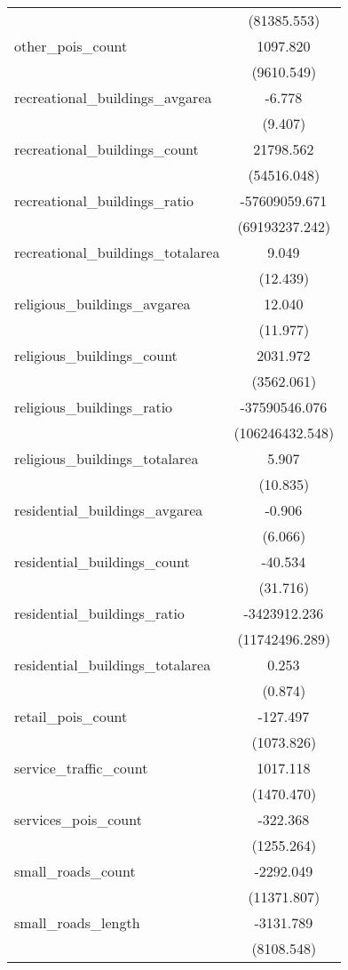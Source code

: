\begin{table}[!htbp]
\begin{tabular}{@{\extracolsep{5pt}}lc}
  & (81385.553) \\
 other_pois_count & 1097.820$^{}$ \\
  & (9610.549) \\
 recreational_buildings_avgarea & -6.778$^{}$ \\
  & (9.407) \\
 recreational_buildings_count & 21798.562$^{}$ \\
  & (54516.048) \\
 recreational_buildings_ratio & -57609059.671$^{}$ \\
  & (69193237.242) \\
 recreational_buildings_totalarea & 9.049$^{}$ \\
  & (12.439) \\
 religious_buildings_avgarea & 12.040$^{}$ \\
  & (11.977) \\
 religious_buildings_count & 2031.972$^{}$ \\
  & (3562.061) \\
 religious_buildings_ratio & -37590546.076$^{}$ \\
  & (106246432.548) \\
 religious_buildings_totalarea & 5.907$^{}$ \\
  & (10.835) \\
 residential_buildings_avgarea & -0.906$^{}$ \\
  & (6.066) \\
 residential_buildings_count & -40.534$^{}$ \\
  & (31.716) \\
 residential_buildings_ratio & -3423912.236$^{}$ \\
  & (11742496.289) \\
 residential_buildings_totalarea & 0.253$^{}$ \\
  & (0.874) \\
 retail_pois_count & -127.497$^{}$ \\
  & (1073.826) \\
 service_traffic_count & 1017.118$^{}$ \\
  & (1470.470) \\
 services_pois_count & -322.368$^{}$ \\
  & (1255.264) \\
 small_roads_count & -2292.049$^{}$ \\
  & (11371.807) \\
 small_roads_length & -3131.789$^{}$ \\
  & (8108.548) \\

\end{tabular}
\end{table}
